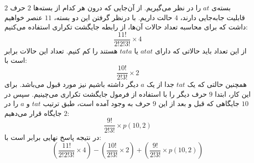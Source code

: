 \p 
$2$ 
بسته‌ی
$at$
را در نظر می‌گیریم. از آن‌جایی که درون هر کدام از بسته‌ها
$2$  
حرف قابلیت جابه‌جایی دارند،
$4$ حالت
داریم. با درنظر گرفتن این دو بسته،
$11$ 
  عنصر خواهیم داشت که برای محاسبه تعداد حالات آن‌ها، از رابطه جایگشت تکراری استفاده می‌کنیم:
$$\frac{11!}{2!2!3!} \times 4$$ 
\p
  از این تعداد باید حالاتی که دارای
$atat$
   یا 
$tata$
   هستند را کم کنیم. تعداد این حالات برابر است با:
$$\frac{10!}{2!3!}\times2$$
\p
  همچنین حالتی که یک
$tat$
     جدا از یک 
$a$
      دیگر داشته باشیم نیز مورد قبول می‌باشد.
      برای این کار، 
      ابتدا 
      $9$ 
             حرف دیگر را با استفاده از فرمول جایگشت تکراری می‌چینیم. سپس در 
      $10$ 
            جایگاهی که قبل و بعد از این 
      $9$ 
            حرف به وجود آمده است،
            طبق ترتیب
      $tat$
            و
      $a$ 
      را در
      $2$ 
      جایگاه‌ قرار می‌دهیم:
      $$\frac{9!}{2!3!} \times {p(10,2)}$$
	\p
     در نتیجه پاسخ نهایی برابر است با:
    \[(\frac{11!}{2!2!3!}\times4) - (\frac{10!}{2!3!}\times2 )+ ({\frac{9!}{2!3!}}\times{p(10,2)})\]
